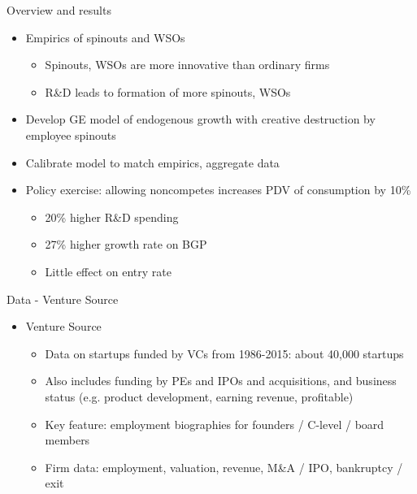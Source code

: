 \documentclass[english,usenames,dvipsnames]{beamer}
\begin{document}
\begin{frame}{Overview and results}
\begin{itemize}
	\item Empirics of spinouts and WSOs
	\begin{itemize}
		\item Spinouts, WSOs are more innovative than ordinary firms
		\item R\&D leads to formation of more spinouts, WSOs
	\end{itemize}
	\item Develop GE model of endogenous growth with creative destruction by employee spinouts
	\item Calibrate model to match empirics, aggregate data
	\item Policy exercise: allowing noncompetes increases PDV of consumption by 10\%
	\begin{itemize}
		\item 20\% higher R\&D spending 
		\item 27\% higher growth rate on BGP
		\item Little effect on entry rate
	\end{itemize}
\end{itemize}
\end{frame}

\begin{frame}{Data - Venture Source}
\begin{itemize}
	\item Venture Source
	\begin{itemize}
		\item Data on startups funded by VCs from 1986-2015: about 40,000 startups
		\item Also includes funding by PEs and IPOs and acquisitions, and business status (e.g. product development, earning revenue, profitable)
		\item Key feature: \alert{employment biographies} for founders / C-level / board members
		\item Firm data: employment, valuation, revenue, M\&A / IPO, bankruptcy / exit
	\end{itemize}
\end{itemize}
\end{frame}
\end{document}
